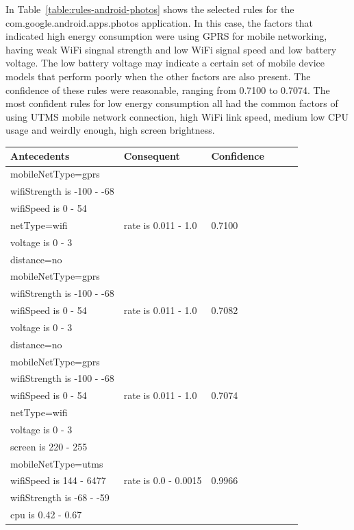 In Table~\ref{table:rules-android-photos} shows the selected rules for the com.google.android.apps.photos application. In this case, the factors that indicated high energy consumption were using GPRS for mobile networking, having weak WiFi singnal strength and low WiFi signal speed and low battery voltage. The low battery voltage may indicate a certain set of mobile device models that perform poorly when the other factors are also present. The confidence of these rules were reasonable, ranging from 0.7100 to 0.7074. The most confident rules for low energy consumption all had the common factors of using UTMS mobile network connection, high WiFi link speed, medium low CPU usage and weirdly enough, high screen brightness. 

\begin{table} \small%
\begin{tabular}{|p{5.0cm}|p{3.0cm}|p{2.0cm}|p{1.5cm}|p{0.3cm}| p{0.3cm}|}
\hline
Antecedents & Consequent & Confidence \\
\hline
	mobileNetType=gprs				& & \\
	wifiStrength is -100 - -68		& & \\
	wifiSpeed is 0 - 54				& & \\
	netType=wifi					& rate is 0.011 - 1.0 & 0.7100 \\
	voltage is 0 - 3				& & \\
	distance=no						& & \\
\hline
	mobileNetType=gprs				& & \\
	wifiStrength is -100 - -68		& & \\
	wifiSpeed is 0 - 54				&  rate is 0.011 - 1.0 & 0.7082 \\
	voltage is 0 - 3				& & \\
	distance=no						& & \\
\hline
	mobileNetType=gprs				& & \\
	wifiStrength is -100 - -68		& & \\
	wifiSpeed is 0 - 54				& rate is 0.011 - 1.0 & 0.7074 \\
	netType=wifi					& & \\
	voltage is 0 - 3				& & \\
\hline
	screen is 220 - 255				& & \\
	mobileNetType=utms				& & \\
	wifiSpeed is 144 - 6477		& rate is 0.0 - 0.0015 & 0.9966 \\
	wifiStrength is -68 - -59		& & \\
	cpu is 0.42 - 0.67				& & \\

\end{tabular}
\end{table}
